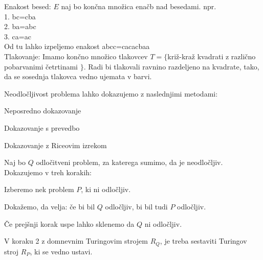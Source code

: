 \documentclass[10pt,a4paper,oneside]{book}
\begin{document}

Enakost besed: $E$ naj bo končna množica enačb nad besedami. npr. \\
1. bc=cba\\
2. ba=abc\\
3. ca=ac\\
Od tu lahko izpeljemo enakost abcc=cacacbaa\\%
\br
Tlakovanje: Imamo končno množico tlakovcev $T=\{$\fixme križ-kraž kvadrati z različno pobarvanimi četrtinami $\}$. Radi bi tlakovali ravnino razdeljeno na kvadrate, tako, da se sosednja tlakovca vedno ujemata v barvi.%
\\

Neodločljivost problema lahko dokazujemo z naslednjimi metodami:
\begin{items}
\item Neposredno dokazovanje %
\item Dokazovanje s prevedbo %
\item Dokazovanje z Riceovim izrekom %
\end{items}

Naj bo $Q$ odločitveni problem, za katerega sumimo, da je neodločljiv.%
Dokazujemo v treh korakih:
\begin{items}
\item Izberemo nek problem $P$, ki ni odločljiv. %
\item Dokažemo, da velja: če bi bil $Q$ odločljiv, bi bil tudi $P$ odločljiv.
\item Če prejšnji korak uspe lahko sklenemo da $Q$ ni odločljiv. %
\end{items}
V koraku 2 z domnevnim Turingovim strojem $R_Q$, je treba sestaviti Turingov stroj $R_P$, ki se vedno ustavi.

\end{document}
